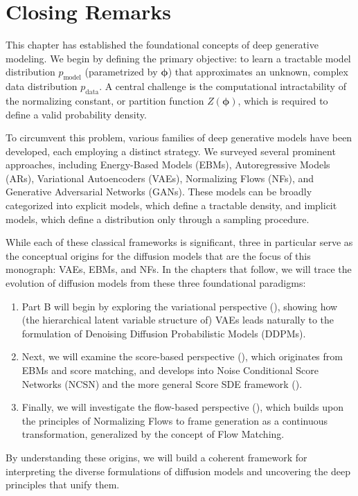 

\newpage
\section{Closing Remarks}\label{sec:ch1_cr}


This chapter has established the foundational concepts of deep generative modeling. We begin by defining the primary objective: to learn a tractable model distribution $p_{\text{model}}$ (parametrized by $\bm{\phi}$) that approximates an unknown, complex data distribution $p_{\text{data}}$. A central challenge is the computational intractability of the normalizing constant, or partition function $Z(\bm{\phi})$, which is required to define a valid probability density.



To circumvent this problem, various families of deep generative models have been developed, each employing a distinct strategy. We surveyed several prominent approaches, including Energy-Based Models (EBMs), Autoregressive Models (ARs), Variational Autoencoders (VAEs), Normalizing Flows (NFs), and Generative Adversarial Networks (GANs). These models can be broadly categorized into explicit models, which define a tractable density, and implicit models, which define a distribution only through a sampling procedure.





While each of these classical frameworks is significant, three in particular serve as the conceptual origins for the diffusion models that are the focus of this monograph: VAEs, EBMs, and NFs. In the chapters that follow, we will trace the evolution of diffusion models from these three foundational paradigms:
\begin{enumerate}
    \item Part B will begin by exploring the variational perspective (), showing how (the hierarchical latent variable structure of) VAEs leads naturally to the formulation of Denoising Diffusion Probabilistic Models (DDPMs).
    \item Next, we will examine the score-based perspective (), which originates from EBMs and score matching, and develops into Noise Conditional Score Networks (NCSN) and the more general Score SDE framework ().
    \item Finally, we will investigate the flow-based perspective (), which builds upon the principles of Normalizing Flows to frame generation as a continuous transformation, generalized by the concept of Flow Matching.
\end{enumerate}

By understanding these origins, we will build a coherent framework for interpreting the diverse formulations of diffusion models and uncovering the deep principles that unify them.


